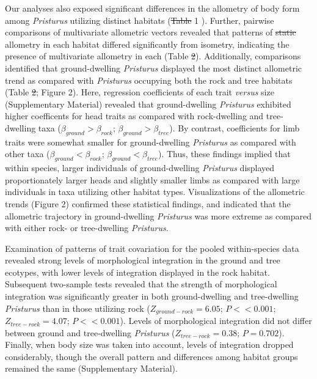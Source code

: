 \documentclass[
  11pt,
]{article}
\providecommand{\DIFaddtex}[1]{{\protect\color{blue}\uwave{#1}}} %
\providecommand{\DIFdeltex}[1]{{\protect\color{red}\sout{#1}}}                      %
\providecommand{\DIFaddbegin}{} %
\providecommand{\DIFaddend}{} %
\providecommand{\DIFdelbegin}{} %
\providecommand{\DIFdelend}{} %
\providecommand{\DIFadd}[1]{\texorpdfstring{\DIFaddtex{#1}}{#1}} %
\providecommand{\DIFdel}[1]{\texorpdfstring{\DIFdeltex{#1}}{}} %
\newcommand{\DIFscaledelfig}{0.5}
\newlength{\DIFdelgraphicswidth} %
\newlength{\DIFdelgraphicsheight} %
\newcommand{\DIFaddincludegraphics}[2][]{{\color{blue}\fbox{\DIFOincludegraphics[#1]{#2}}}} %
\newcommand{\DIFdelincludegraphics}[2][]{%
\sbox{\DIFdelgraphicsbox}{\DIFOincludegraphics[#1]{#2}}%
\settoboxwidth{\DIFdelgraphicswidth}{\DIFdelgraphicsbox} %
\settoboxtotalheight{\DIFdelgraphicsheight}{\DIFdelgraphicsbox} %
\scalebox{\DIFscaledelfig}{%
\parbox[b]{\DIFdelgraphicswidth}{\usebox{\DIFdelgraphicsbox}\\[-\baselineskip] \rule{\DIFdelgraphicswidth}{0em}}\llap{\resizebox{\DIFdelgraphicswidth}{\DIFdelgraphicsheight}{%
\setlength{\unitlength}{\DIFdelgraphicswidth}%
\begin{picture}(1,1)%
\thicklines\linethickness{2pt} %
{\color[rgb]{1,0,0}\put(0,0){\framebox(1,1){}}}%
{\color[rgb]{1,0,0}\put(0,0){\line( 1,1){1}}}%
{\color[rgb]{1,0,0}\put(0,1){\line(1,-1){1}}}%
\end{picture}%
}\hspace*{3pt}}} %
} %
\DeclareRobustCommand{\DIFaddbegin}{\DIFOaddbegin \let\includegraphics\DIFaddincludegraphics} %
\DeclareRobustCommand{\DIFaddend}{\DIFOaddend \let\includegraphics\DIFOincludegraphics} %
\DeclareRobustCommand{\DIFdelbegin}{\DIFOdelbegin \let\includegraphics\DIFdelincludegraphics} %
\DeclareRobustCommand{\DIFdelend}{\DIFOaddend \let\includegraphics\DIFOincludegraphics} %
\begin{document}
Our analyses also exposed significant differences in the allometry of
body form among \emph{Pristurus} utilizing distinct habitats (\DIFdelbegin \DIFdel{Table }\DIFdelend \DIFaddbegin \DIFadd{Tables }\DIFaddend 1
\DIFaddbegin \DIFadd{and 2}\DIFaddend ). Further, pairwise comparisons of multivariate allometric vectors
revealed that patterns of \DIFdelbegin \DIFdel{static }\DIFdelend \DIFaddbegin \DIFadd{intraspecific }\DIFaddend allometry in each habitat
differed significantly from isometry, indicating the presence of
multivariate allometry in each (Table \DIFdelbegin \DIFdel{2}\DIFdelend \DIFaddbegin \DIFadd{3}\DIFaddend ). Additionally, comparisons
identified that ground-dwelling \emph{Pristurus} displayed the most
distinct allometric trend as compared with \emph{Pristurus} occupying
both the rock and tree habitats (Table \DIFdelbegin \DIFdel{2}\DIFdelend \DIFaddbegin \DIFadd{3}\DIFaddend ; Figure 2). Here, regression
coefficients of each trait \emph{versus} size (Supplementary Material)
revealed that ground-dwelling \emph{Pristurus} exhibited higher
coefficents for head traits as compared with rock-dwelling and
tree-dwelling taxa (\(\beta_{ground}>\beta_{rock}\);
\(\beta_{ground}>\beta_{tree}\)). By contrast, coefficients for limb
traits were somewhat smaller for ground-dwelling \emph{Pristurus} as
compared with other taxa (\(\beta_{ground}<\beta_{rock}\);
\(\beta_{ground}<\beta_{tree}\)). Thus, these findings implied that
within species, larger individuals of ground-dwelling \emph{Pristurus}
displayed proportionately larger heads and slightly smaller limbs as
compared with large individuals in taxa utilizing other habitat types.
Visualizations of the allometric trends (Figure 2) confirmed these
statistical findings, and indicated that the allometric trajectory in
ground-dwelling \emph{Pristurus} was more extreme as compared with
either rock- or tree-dwelling \emph{Pristurus}. \hfill\break

Examination of patterns of trait covariation for the pooled
within-species data revealed strong levels of morphological integration
in the ground and tree ecotypes, with lower levels of integration
displayed in the rock habitat. Subsequent two-sample tests revealed that
the strength of morphological integration was significantly greater in
both ground-dwelling and tree-dwelling \emph{Pristurus} than in those
utilizing rock (\(Z_{ground-rock}=6.05\); \(P << 0.001\);
\(Z_{tree-rock}=4.07\); \(P << 0.001\)). Levels of morphological
integration did not differ between ground and tree-dwelling
\emph{Pristurus} (\(Z_{tree-rock}=0.38\); \(P = 0.702\)). Finally, when
body size was taken into account, levels of integration dropped
considerably, though the overall pattern and differences among habitat
groups remained the same (Supplementary Material). \hfill\break
\end{document}
